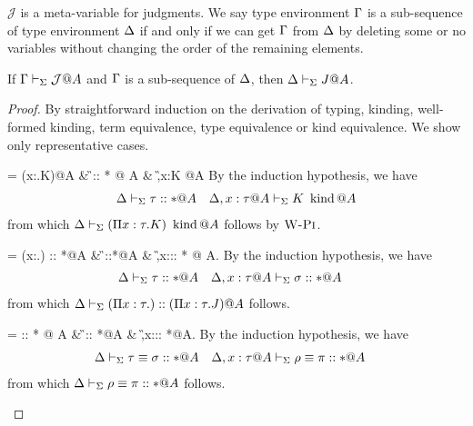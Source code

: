 

$\mathcal{J}$ is a meta-variable for judgments.
We say type environment \(\Gamma\) is a sub-sequence of type environment \(\Delta\)
if and only if we can get \(\Gamma\) from \(\Delta\) by deleting some or no variables without changing the order of the remaining elements.
\begin{lemma}[Weakening]
    \label{lemma:Weakening}
    If \(\Gamma \vdash_\Sigma \mathcal{J}@A\) and \(\Gamma\) is a sub-sequence of \(\Delta\), then \(\Delta \vdash_\Sigma J@A\).
\end{lemma}

\begin{proof}
    By straightforward induction on the derivation of typing, kinding, well-formed kinding,
    term equivalence, type equivalence or kind equivalence.
    We show only representative cases.

    \begin{rneqncase}{\WPi{}}{
             = (\Pi x:\tau.K)\iskind @A &
            \G \V \tau :: * @ A & \G,x:\tau@A \V K \iskind @A
            }
            By the induction hypothesis, we have
            \begin{align*}
                & \D \V \tau::*@A & \D, x:\tau@A \V K \iskind @ A
            \end{align*}
            from which $\Delta\vdash_\Sigma (\Pi x:\tau.K) \operatorname{\ kind} @ A$ follows by $\textsc{W-Pi}$.
    \end{rneqncase}

    \begin{rneqncase}{\KPi{}}{
             = (\Pi x:\tau.\sigma) :: *@A &
            \G \V \tau::*@A & \G,x:\tau@A\V \sigma :: * @ A.
            }
            By the induction hypothesis, we have
            \begin{align*}
                & \D \V \tau::*@A &  & \D,x:\tau@A\V \sigma :: * @ A
            \end{align*}
            from which $\Delta \vdash_\Sigma (\Pi x:\tau.) :: (\Pi x:\tau.J)@A$ follows.
    \end{rneqncase}

    \begin{rneqncase}{
            \QTAbs{}}{
             = \rho \E \pi :: * @ A &
            \G\V \tau \E \sigma :: *@A  & \G,x:\tau@A \V \rho \E \pi :: *@A.
            }
            By the induction hypothesis, we have
            \begin{align*}
                & \D\V \tau \E \sigma :: *@A &  & \D,x:\tau@A \V \rho \E \pi :: *@A
            \end{align*}
            from which \( \Delta\vdash_\Sigma \rho \equiv \pi :: * @ A \) follows.
    \end{rneqncase}
\end{proof}

